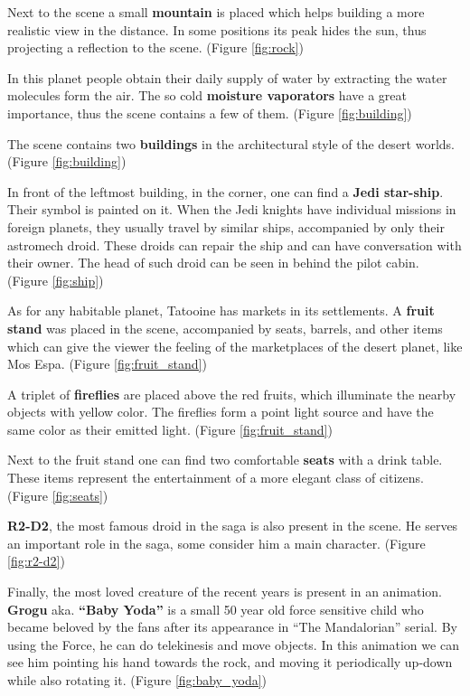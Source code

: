 Next to the scene a small \textbf{mountain} is placed which helps building a more realistic view in the distance. In some positions its peak hides the sun, thus projecting a reflection to the scene. (Figure \ref{fig:rock})

In this planet people obtain their daily supply of water by extracting the water molecules form the air. The so cold \textbf{moisture vaporators} have a great importance, thus the scene contains a few of them. (Figure \ref{fig:building})

The scene contains two \textbf{buildings} in the architectural style of the desert worlds. (Figure \ref{fig:building})

In front of the leftmost building, in the corner, one can find a \textbf{Jedi star-ship}. Their symbol is painted on it. When the Jedi knights have individual missions in foreign planets, they usually travel by similar ships, accompanied by only their astromech droid. These droids can repair the ship and can have conversation with their owner. The head of such droid can be seen in behind the pilot cabin. (Figure \ref{fig:ship})

As for any habitable planet, Tatooine has markets in its settlements. A \textbf{fruit stand} was placed in the scene, accompanied by seats, barrels, and other items which can give the viewer the feeling of the marketplaces of the desert planet, like Mos Espa. (Figure \ref{fig:fruit_stand})

A triplet of \textbf{fireflies} are placed above the red fruits, which illuminate the nearby objects with yellow color. The fireflies form a point light source and have the same color as their emitted light. (Figure \ref{fig:fruit_stand})

Next to the fruit stand one can find two comfortable \textbf{seats} with a drink table. These items represent the entertainment of a more elegant class of citizens. (Figure \ref{fig:seats})

\textbf{R2-D2}, the most famous droid in the saga is also present in the scene. He serves an important role in the saga, some consider him a main character. (Figure \ref{fig:r2-d2})

Finally, the most loved creature of the recent years is present in an animation. \textbf{Grogu} aka. \textbf{``Baby Yoda''} is a small 50 year old force sensitive child who became beloved by the fans after its appearance in ``The Mandalorian'' serial. By using the Force, he can do telekinesis and move objects. In this animation we can see him pointing his hand towards the rock, and moving it periodically up-down while also rotating it. (Figure \ref{fig:baby_yoda})


